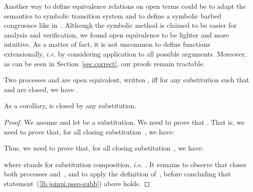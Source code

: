 \documentclass{LMCS}
\makeatletter
\newcommand{\forget}[1]{}
\newcommand{\resetequationcounter}{\setcounter{equation}{0}}
\newcommand{\ie}{\emph{i.e.}\@\xspace}
\renewcommand{\_}{\mathord{\rule[-.25ex]{1ex}{.15ex}}}
\makeatother
\begin{document}
Another way to define equivalence relations on open terms could be to
adapt the semantics to symbolic transition system and to define a
symbolic barbed congruence like in~\cite{SymbolicBisi}.  Although the
symbolic method is claimed to be easier for analysis and verification,
we found open equivalence to be lighter and more intuitive.  As a
matter of fact, it is not uncommon to define functions extensionally,
\ie by considering application to all possible arguments.  Moreover,
as can be seen in Section~\ref{sec.correct}, our proofs remain
tractable.
\begin{defi}
  \label{def.joinpi.pseq}
  Two processes  and  are open equivalent, written ,
  iff for any substitution  such that  and
   are closed, we have .
\end{defi}
As a corollary,  is closed by any substitution.
\begin{lem}\label{lemma.pseq-sub}
  
\end{lem}
\resetequationcounter
\begin{proof}
  We assume  and let  be a substitution. We need to
  prove that . That is,
  we need to prove that, for all closing substitution~, we
  have:

Thus, we need to prove that, for all closing substitution~, we
have:

where  stands for substitution composition, \ie
.
It remains to observe that
 closes both processes  and~,
and to apply the definition of~, before concluding
that statement~(\ref{lb.joinpi.pseq-subb}) above holds. \forget{\qed}
\end{proof}
\end{document}
